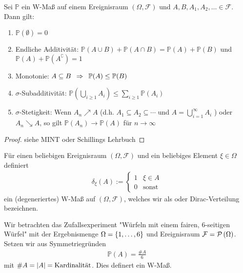 \begin{satz}
    Sei $\mathbb{P}$ ein W-Maß auf einem Ereignisraum $(\Omega, \mathcal{F})$ und $A,B,A_1,A_2,\dots \in \mathcal{F}$. Dann gilt:
    \begin{enumerate}[leftmargin=*]
        \item $\mathbb{P}(\emptyset) = 0$
        \item Endliche Additivität: $\mathbb{P} (A \cup B) + \mathbb{P} (A \cap B) = \mathbb{P}(A) + \mathbb{P}(B)$ und $\mathbb{P}(A) + \mathbb{P}(A^\complement) = 1$
        \item Monotonie: $A \subseteq B \enskip \Rightarrow \enskip \mathbb{P}(A) \leq \mathbb{P}(B)$
        \item $\sigma$-Subadditivität: $\mathbb{P}\left(\bigcup_{i \geq 1} A_i \right)  \leq \sum_{i \geq 1} \mathbb{P}(A_i)$
        \item $\sigma$-Stetigkeit: Wenn $A_n \nearrow A$ (d.h. $A_1 \subseteq A_2 \subseteq \cdots$ und $A = \bigcup_{i=1}^{\infty}A_i$ ) oder $A_n \searrow A$, so gilt $\mathbb{P}(A_n) \to \mathbb{P}(A)$ für $n \to \infty$
    \end{enumerate}
\end{satz}
\begin{proof}
    siehe MINT oder Schillings Lehrbuch
\end{proof}

\begin{beispiel}
    Für einen beliebigen Ereignisraum $(\Omega, \mathcal{F})$ und ein beliebiges Element $\xi \in \Omega$ definiert
    \begin{align*}
        \delta_\xi(A) := \begin{cases} 1 & \xi \in A \\ 0 & \text{sonst} \end{cases}
    \end{align*}
    ein (degeneriertes) W-Maß auf $(\Omega, \mathcal{F})$, welches wir als  oder Dirac-Verteilung bezeichnen.
\end{beispiel}

\begin{beispiel}
    Wir betrachten das Zufallsexperiment "Würfeln mit einem fairen, 6-seitigen Würfel" mit der Ergebnismenge $\Omega = \left\{ 1, \dots, 6 \right\}$ und Ereignisraum $\mathcal{F} = \mathcal{P}\left( \Omega \right)$. Setzen wir aus Symmetriegründen
    \begin{align*}
        \mathbb{P}(A) = \frac{\# A}{6}
    \end{align*}
    mit $\# A = \left| A \right| = \text{Kardinalität}$. Dies definert ein W-Maß.
\end{beispiel}

